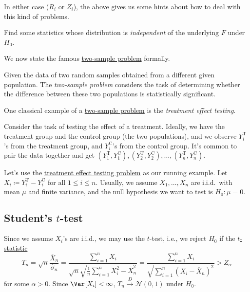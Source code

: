 In either case (\(R_i\) or \(Z_i\)), the above gives us some hints about how to deal with this kind of problems.

\begin{intuition}
	Find some statistics whose distribution is \emph{independent} of the underlying \(F\) under \(H_0\).
\end{intuition}

We now state the famous \hyperref[prb:two-sample]{two-sample problem} formally.

\begin{problem}\label{prb:two-sample}
Given the data of two random samples obtained from a different given population. The \emph{two-sample problem} considers the task of determining whether the difference between these two populations is statistically significant.
\end{problem}

One classical example of a \hyperref[prb:two-sample]{two-sample problem} is the \emph{treatment effect testing}.

\begin{eg}\label{eg:treatment-effect}
	Consider the task of testing the effect of a treatment. Ideally, we have the treatment group and the control group (the two populations), and we observe \(Y_i^{\text{T} }\)'s from the treatment group, and \(Y_i^{\text{C} }\)'s from the control group. It's common to pair the data together and get \((Y_1^{\text{T} }, Y_1^{\text{C} }), (Y_2^{\text{T} }, Y_2^{\text{C} }), \dots , (Y_n^{\text{T} }, Y_n^{\text{C} })\).
\end{eg}

Let's use the \hyperref[eg:treatment-effect]{treatment effect testing problem} as our running example. Let \(X_i \coloneqq Y_i^{\text{T} } - Y_i^{\text{C} }\) for all \(1 \leq i \leq n\). Usually, we assume \(X_1 , \dots , X_n\) are i.i.d.\ with mean \(\mu \) and finite variance, and the null hypothesis we want to test is \(H_0 \colon \mu = 0\).

\subsection{Student's \(t\)-test}
Since we assume \(X_i\)'s are i.i.d., we may use the \(t\)-test, i.e., we reject \(H_0\) if the \hyperref[def:t-statistic]{\(t\)-statistic}
\[
	T_n
	= \sqrt{n} \frac{\overline{X} _n}{\hat{\sigma} _n}
	= \frac{\sum_{i=1}^{n} X_i}{\sqrt{n} \sqrt{\frac{1}{n} \sum_{i=1}^{n} X_i^2 - \overline{X} _n^2} }
	= \frac{\sum_{i=1}^{n} X_i}{\sqrt{\sum_{i=1}^{n} (X_i - \overline{X} _n)^2} }
	> Z_{\alpha }
\]
for some \(\alpha > 0\). Since \(\Var_{}[X_i] < \infty \), \(T_n \overset{D}{\to} \mathcal{N} (0, 1)\) under \(H_0\).

